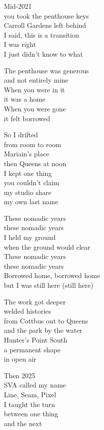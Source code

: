 \begin{lyrics}
Mid-2021\\
you took the penthouse keys\\
Carroll Gardens left behind\\
I said, this is a transition\\
I was right\\
I just didn't know to what

The penthouse was generous\\
and not entirely mine\\
When you were in it\\
it was a home\\
When you were gone\\
it felt borrowed

So I drifted\\
from room to room\\
Mariain's place\\
then Queens at noon\\
I kept one thing\\
you couldn't claim\\
my studio share\\
my own last name

These nomadic years\\
these nomadic years\\
I held my ground\\
when the ground would clear\\
These nomadic years\\
these nomadic years\\
Borrowed home, borrowed home\\
but I was still here (still here)

The work got deeper\\
welded histories\\
from Cottbus out to Queens\\
and the park by the water\\
Hunter's Point South\\
a permanent shape\\
in open air

Then 2025\\
SVA called my name\\
Line, Seam, Pixel\\
I taught the turn\\
between one thing\\
and the next


\end{lyrics}
